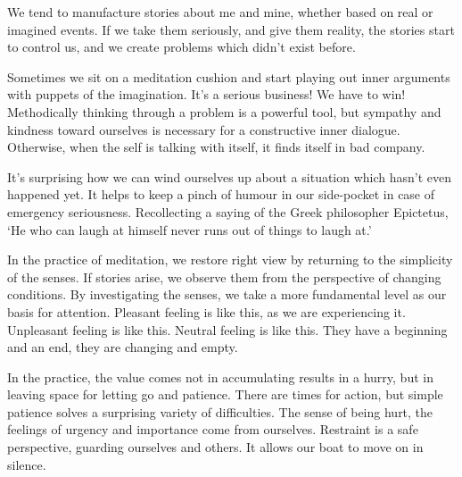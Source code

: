 We tend to manufacture stories about me and mine, whether based on real
or imagined events. If we take them seriously, and give them reality,
the stories start to control us, and we create problems which didn't
exist before.

Sometimes we sit on a meditation cushion and start playing out inner
arguments with puppets of the imagination. It's a serious business! We
have to win! Methodically thinking through a problem is a powerful tool,
but sympathy and kindness toward ourselves is necessary for a
constructive inner dialogue. Otherwise, when the self is talking with
itself, it finds itself in bad company.


It's surprising how we can wind ourselves up about a situation which
hasn't even happened yet. It helps to keep a pinch of humour in our
side-pocket in case of emergency seriousness. Recollecting a saying of
the Greek philosopher Epictetus, `He who can laugh at himself never runs
out of things to laugh at.'


In the practice of meditation, we restore right view by returning to the
simplicity of the senses. If stories arise, we observe them from the
perspective of changing conditions. By investigating the senses, we take
a more fundamental level as our basis for attention. Pleasant feeling is
like this, as we are experiencing it. Unpleasant feeling is like this.
Neutral feeling is like this. They have a beginning and an end, they are
changing and empty.

In the practice, the value comes not in accumulating results in a hurry,
but in leaving space for letting go and patience. There are times for
action, but simple patience solves a surprising variety of difficulties.
The sense of being hurt, the feelings of urgency and importance come
from ourselves. Restraint is a safe perspective, guarding ourselves and
others. It allows our boat to move on in silence.
